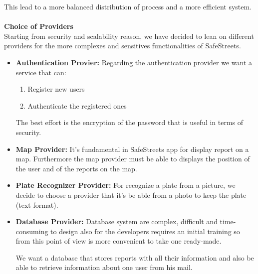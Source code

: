 \documentclass[../RASD.tex]{subfiles}
\begin{document}
    This lead to a more balanced distribution of process and a more efficient system.
    \\
    \\
    \textbf{Choice of Providers} \\
    Starting from security and scalability reason, we have decided to lean on different providers for the more complexes and sensitives functionalities of SafeStreets.
    \begin{itemize}
        \item \textbf{Authentication Provier:} Regarding the authentication provider we want a service that can: \begin{enumerate}
                                                                                                                     \item Register new users
                                                                                                                     \item Authenticate the registered ones
                                                                                                                 \end{enumerate}
        The best effort is the encryption of the password that is useful in terms of security.
        \item \textbf{Map Provider:} It’s fundamental in SafeStreets app for display report on a map. Furthermore the map provider must be able to displays the position of the user and of the reports on the map.
        \item \textbf{Plate Recognizer Provider:} For recognize a plate from a picture, we decide to choose a provider that it’s be able from a photo to keep the plate (text format).
        \item \textbf{Database Provider:} Database system are complex, difficult and time-consuming to design also for the developers requires an initial training so from this point of view is more convenient to take one ready-made.

        We want a database that stores reports with all their information and also be able to retrieve information about one user from his mail.

    \end{itemize}
\end{document}
